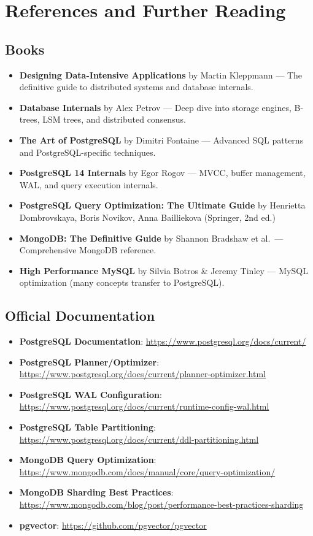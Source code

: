 \documentclass[12pt,a4paper]{article}
\begin{document}
\section{References and Further Reading}

\subsection{Books}

\begin{itemize}
    \item \textbf{Designing Data-Intensive Applications} by Martin Kleppmann --- The definitive guide to distributed systems and database internals.
    \item \textbf{Database Internals} by Alex Petrov --- Deep dive into storage engines, B-trees, LSM trees, and distributed consensus.
    \item \textbf{The Art of PostgreSQL} by Dimitri Fontaine --- Advanced SQL patterns and PostgreSQL-specific techniques.
    \item \textbf{PostgreSQL 14 Internals} by Egor Rogov --- MVCC, buffer management, WAL, and query execution internals.
    \item \textbf{PostgreSQL Query Optimization: The Ultimate Guide} by Henrietta Dombrovskaya, Boris Novikov, Anna Bailliekova (Springer, 2nd ed.)
    \item \textbf{MongoDB: The Definitive Guide} by Shannon Bradshaw et al.\ --- Comprehensive MongoDB reference.
    \item \textbf{High Performance MySQL} by Silvia Botros \& Jeremy Tinley --- MySQL optimization (many concepts transfer to PostgreSQL).
\end{itemize}

\subsection{Official Documentation}

\begin{itemize}
    \item \textbf{PostgreSQL Documentation}: \url{https://www.postgresql.org/docs/current/}
    \item \textbf{PostgreSQL Planner/Optimizer}: \url{https://www.postgresql.org/docs/current/planner-optimizer.html}
    \item \textbf{PostgreSQL WAL Configuration}: \url{https://www.postgresql.org/docs/current/runtime-config-wal.html}
    \item \textbf{PostgreSQL Table Partitioning}: \url{https://www.postgresql.org/docs/current/ddl-partitioning.html}
    \item \textbf{MongoDB Query Optimization}: \url{https://www.mongodb.com/docs/manual/core/query-optimization/}
    \item \textbf{MongoDB Sharding Best Practices}: \url{https://www.mongodb.com/blog/post/performance-best-practices-sharding}
    \item \textbf{pgvector}: \url{https://github.com/pgvector/pgvector}
\end{itemize}
\end{document}
